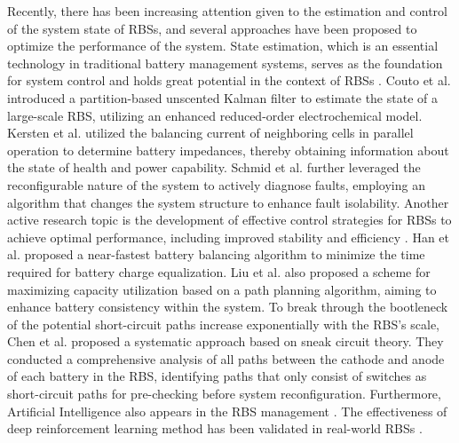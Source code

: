 \documentclass{article}
\begin{document}
Recently, there has been increasing attention given to the estimation and control of the system state of RBSs, and several approaches have been proposed to optimize the performance of the system. 
State estimation, which is an essential technology in traditional battery management systems, serves as the foundation for system control and holds great potential in the context of RBSs \cite{komsiyskaCriticalReviewIntelligent2021}.
Couto et al. \cite{coutoPartitionbasedUnscentedKalman2018a} introduced a partition-based unscented Kalman filter to estimate the state of a large-scale RBS, utilizing an enhanced reduced-order electrochemical model. 
Kersten et al. \cite{kerstenOnlineOnBoardBattery2020a} utilized the balancing current of neighboring cells in parallel operation to determine battery impedances, thereby obtaining information about the state of health and power capability. 
Schmid et al. \cite{schmidActiveModelBasedFault2021a} further leveraged the reconfigurable nature of the system to actively diagnose faults, employing an algorithm that changes the system structure to enhance fault isolability. 
Another active research topic is the development of effective control strategies for RBSs to achieve optimal performance, including improved stability \cite{kacetlDesignAnalysisModular2023b} and efficiency \cite{yangAdaptiveControlFramework2022}.
Han et al. \cite{hanNearFastestBatteryBalancing2019a} proposed a near-fastest battery balancing algorithm to minimize the time required for battery charge equalization.
Liu et al. \cite{liuFlexiblePathPlanningbased2023a} also proposed a scheme for maximizing capacity utilization based on a path planning algorithm, aiming to enhance battery consistency within the system.
To break through the bootleneck of the potential short-circuit paths increase exponentially with the RBS's scale, Chen et al. \cite{chenSneakCircuitTheory2021} proposed a systematic approach based on sneak circuit theory. 
They conducted a comprehensive analysis of all paths between the cathode and anode of each battery in the RBS, identifying paths that only consist of switches as short-circuit paths for pre-checking before system reconfiguration. 
Furthermore, Artificial Intelligence also appears in the RBS management \cite{liuLongLifetimeBattery2022a}.
The effectiveness of deep reinforcement learning method has been validated in real-world RBSs \cite{yangAdaptiveControlFramework2022}.
\end{document}
